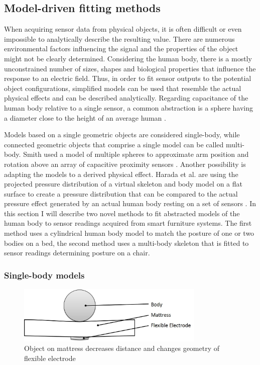 \subsection{Model-driven fitting methods}
\label{ch:proc_model}
When acquiring sensor data from physical objects, it is often difficult or even impossible to analytically describe the resulting value. There are numerous environmental factors influencing the signal and the properties of the object might not be clearly determined. Considering the human body, there is a mostly unconstrained number of sizes, shapes and biological properties that influence the response to an electric field. Thus, in order to fit sensor outputs to the potential object configurations, simplified models can be used that resemble the actual physical effects and can be described analytically. Regarding capacitance of the human body relative to a single sensor, a common abstraction is a sphere having a diameter close to the height of an average human \cite{seaver1997human}.

Models based on a single geometric objects are considered single-body, while connected geometric objects that comprise a single model can be called multi-body. Smith used a model of multiple spheres to approximate arm position and rotation above an array of capacitive proximity sensors \cite{smith1998electric}. Another possibility is adapting the models to a derived physical effect. Harada et al. are using the projected pressure distribution of a virtual skeleton and body model on a flat surface to create a pressure distribution that can be compared to the actual pressure effect generated by an actual human body resting on a set of sensors \cite{harada2000human}. In this section I will describe two novel methods to fit abstracted models of the human body to sensor readings acquired from smart furniture systems. The first method uses a cylindrical human body model to match the posture of one or two bodies on a bed, the second method uses a multi-body skeleton that is fitted to sensor readings determining posture on a chair.

\subsubsection{Single-body models}
\begin{figure}[ht]
\centering
\includegraphics[width=0.8\textwidth]{images/proc_hetero_flexpressure}
\caption{Object on mattress decreases distance and changes geometry of flexible electrode \cite{braun2012context}}
\label{fig:proc_hetero_flexpressure}
\end{figure}

